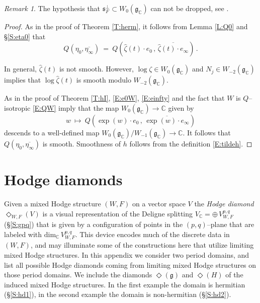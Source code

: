 \documentclass[12pt]{amsart}
\numberwithin{equation}{section}
\numberwithin{table}{section}
\def\z{\zeta}
\def\bC{\mathbb{C}}
\def\tdim{\mathrm{dim}}
\def\fg{\mathfrak{g}}
\def\op{\oplus}
\theoremstyle{definition}
\theoremstyle{definition}
\theoremstyle{remark}
\newtheorem{remark}[equation]{Remark}
\def\fs{\mathfrak{s}}
\begin{document}
\begin{remark}
The hypothesis that $\fs_F^\perp \subset W_0(\fg_\bC)$ can not be dropped, see \cite{Robles-pseudocnvx-eg}.
\end{remark}

\begin{proof}
As in the proof of Theorem \ref{T:herm}, it follows from Lemma \ref{L:Q0} and \S\ref{S:eta0} that 
\begin{equation} \nonumber %
  Q(\eta_0,\overline{\eta_\infty}) \ = \ 
  Q \left( \hat\z(t)\cdot e_0 \,,\,
  \overline{\hat\z(t)\cdot e_\infty} \right) \,.
\end{equation}

In general, $\hat\z(t)$ is not smooth.  However, $\log\z \in W_0(\fg_\bC)$ and $N_j \in W_{-2}(\fg_\bC)$ implies that $\log\hat\z(t)$ is smooth modulo $W_{-2}(\fg_\bC)$.

As in the proof of Theorem \ref{T:hI}, \eqref{E:e0W}, \eqref{E:einfty} and the fact that $W$ is $Q$--isotropic \eqref{E:QW} imply that the map $W_0(\fg_\bC) \to \bC$ given by 
\[
  w \ \mapsto \ 
  Q \left( \exp(w)\cdot e_0 \,,\,
  \overline{\exp(w)\cdot e_\infty} \right)
\]
descends to a well-defined map $W_0(\fg_\bC)/W_{-1}(\fg_\bC) \to \bC$.  It follows that $Q(\eta_0,\overline{\eta_\infty})$ is smooth.  Smoothness of $h$ follows from the definition \eqref{E:tildeh}.
\end{proof}

\appendix

\section{Hodge diamonds} \label{S:hd}

Given a mixed Hodge structure $(W,F)$ on a vector space $V$ the \emph{Hodge diamond} $\Diamond_{W,F}(V)$ is a visual representation of the Deligne splitting $V_\bC = \op\,V^{p,q}_{W,F}$ (\S\ref{S:gpq}) that is given by a configuration of points in the $(p,q)$--plane that are labeled with $\tdim_\bC\,V^{p,q}_{W,F}$.  This device encodes much of the discrete data in $(W,F)$, and may illuminate some of the constructions here that utilize limiting mixed Hodge structures.  In this appendix we consider two period domains, and list all possible Hodge diamonds coming from limiting mixed Hodge structures on those period domains.  We include the diamonds $\Diamond(\fg)$ and $\Diamond(H)$ of the induced mixed Hodge structures.  In the first example the domain is hermitian (\S\ref{S:hd1}), in the second example the domain is non-hermitian (\S\ref{S:hd2}).
\end{document}
